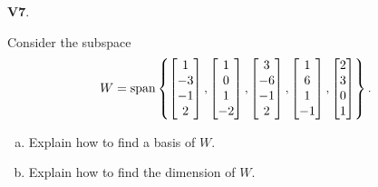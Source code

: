 \documentclass{article}
\newenvironment{problem}[1]
{
  \begin{flushleft}
  \textbf{#1}.
  \ignorespaces
}
{
  \end{flushleft}
}
\begin{document}
\begin{problem}{V7}
Consider the subspace 
\[
  W = \operatorname{span} \left\{
  \begin{bmatrix} 1 \\ -3 \\ -1 \\ 2 \end{bmatrix} ,
  \begin{bmatrix} 1 \\ 0 \\ 1 \\ -2 \end{bmatrix} ,
  \begin{bmatrix} 3 \\ -6 \\ -1 \\ 2 \end{bmatrix} ,
  \begin{bmatrix} 1 \\ 6 \\ 1 \\ -1 \end{bmatrix} ,
  \begin{bmatrix} 2 \\ 3 \\ 0 \\ 1 \end{bmatrix}
  \right\} .
\]
\begin{enumerate}[(a)]
\item Explain how to find a basis of \(W\).
\item Explain how to find the dimension of \(W\).
\end{enumerate}
\end{problem}
\end{document}
